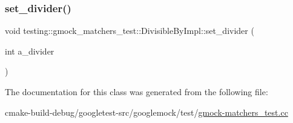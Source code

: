 \subsubsection{\texorpdfstring{set\_divider()}{set\_divider()}}
{\footnotesize\ttfamily void testing\+::gmock\+\_\+matchers\+\_\+test\+::\+Divisible\+By\+Impl\+::set\+\_\+divider (\begin{DoxyParamCaption}\item[{int}]{a\+\_\+divider }\end{DoxyParamCaption})\hspace{0.3cm}{\ttfamily [inline]}}



The documentation for this class was generated from the following file\+:\begin{DoxyCompactItemize}
\item 
cmake-\/build-\/debug/googletest-\/src/googlemock/test/\mbox{\hyperlink{gmock-matchers__test_8cc}{gmock-\/matchers\+\_\+test.\+cc}}\end{DoxyCompactItemize}
